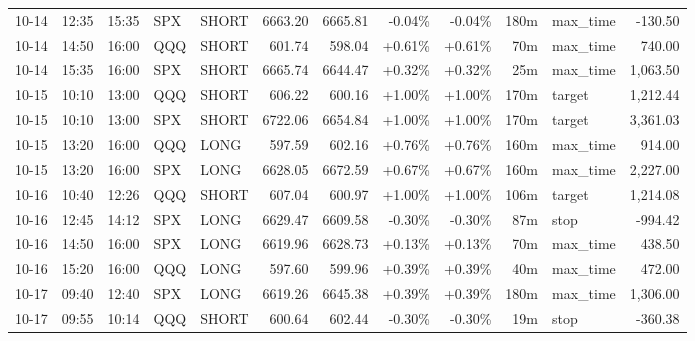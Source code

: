 \documentclass[11pt,a4paper,twoside]{article}
\begin{document}
\begin{center}
\begin{longtable}{>{\color{txtmain}}l l l l l r r r r r >{\color{txtmain}}l r}
10-14 & 12:35 & 15:35 & SPX & SHORT & 6663.20 & 6665.81 & \textcolor{lossred}{-0.04\%} & \textcolor{lossred}{-0.04\%} & 180m & max\_time & \textcolor{lossred}{-130.50} \\
10-14 & 14:50 & 16:00 & QQQ & SHORT & 601.74 & 598.04 & \textcolor{wingreen}{+0.61\%} & \textcolor{wingreen}{+0.61\%} & 70m & max\_time & \textcolor{wingreen}{740.00} \\
10-14 & 15:35 & 16:00 & SPX & SHORT & 6665.74 & 6644.47 & \textcolor{wingreen}{+0.32\%} & \textcolor{wingreen}{+0.32\%} & 25m & max\_time & \textcolor{wingreen}{1,063.50} \\
10-15 & 10:10 & 13:00 & QQQ & SHORT & 606.22 & 600.16 & \textcolor{wingreen}{+1.00\%} & \textcolor{wingreen}{+1.00\%} & 170m & target & \textcolor{wingreen}{1,212.44} \\
10-15 & 10:10 & 13:00 & SPX & SHORT & 6722.06 & 6654.84 & \textcolor{wingreen}{+1.00\%} & \textcolor{wingreen}{+1.00\%} & 170m & target & \textcolor{wingreen}{3,361.03} \\
10-15 & 13:20 & 16:00 & QQQ & LONG & 597.59 & 602.16 & \textcolor{wingreen}{+0.76\%} & \textcolor{wingreen}{+0.76\%} & 160m & max\_time & \textcolor{wingreen}{914.00} \\
10-15 & 13:20 & 16:00 & SPX & LONG & 6628.05 & 6672.59 & \textcolor{wingreen}{+0.67\%} & \textcolor{wingreen}{+0.67\%} & 160m & max\_time & \textcolor{wingreen}{2,227.00} \\
10-16 & 10:40 & 12:26 & QQQ & SHORT & 607.04 & 600.97 & \textcolor{wingreen}{+1.00\%} & \textcolor{wingreen}{+1.00\%} & 106m & target & \textcolor{wingreen}{1,214.08} \\
10-16 & 12:45 & 14:12 & SPX & LONG & 6629.47 & 6609.58 & \textcolor{lossred}{-0.30\%} & \textcolor{lossred}{-0.30\%} & 87m & stop & \textcolor{lossred}{-994.42} \\
10-16 & 14:50 & 16:00 & SPX & LONG & 6619.96 & 6628.73 & \textcolor{wingreen}{+0.13\%} & \textcolor{wingreen}{+0.13\%} & 70m & max\_time & \textcolor{wingreen}{438.50} \\
10-16 & 15:20 & 16:00 & QQQ & LONG & 597.60 & 599.96 & \textcolor{wingreen}{+0.39\%} & \textcolor{wingreen}{+0.39\%} & 40m & max\_time & \textcolor{wingreen}{472.00} \\
10-17 & 09:40 & 12:40 & SPX & LONG & 6619.26 & 6645.38 & \textcolor{wingreen}{+0.39\%} & \textcolor{wingreen}{+0.39\%} & 180m & max\_time & \textcolor{wingreen}{1,306.00} \\
10-17 & 09:55 & 10:14 & QQQ & SHORT & 600.64 & 602.44 & \textcolor{lossred}{-0.30\%} & \textcolor{lossred}{-0.30\%} & 19m & stop & \textcolor{lossred}{-360.38} \\

\end{longtable}
\end{center}
\end{document}
